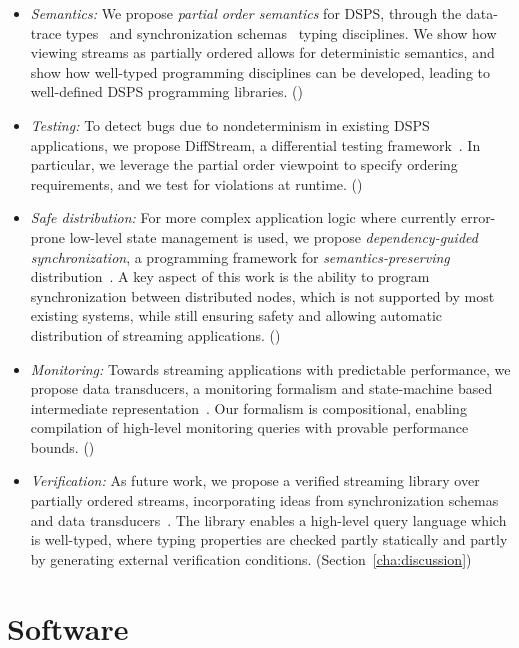 \begin{itemize}
\item
\emph{Semantics:}
We propose \emph{partial order semantics} for DSPS,
through the data-trace types~ and synchronization schemas~ typing disciplines.
We show how viewing streams as partially ordered allows for deterministic semantics,
and show how well-typed programming disciplines can be developed,
leading to well-defined DSPS programming libraries.
()

\item
\emph{Testing:}
To detect bugs due to nondeterminism in existing DSPS applications,
we propose DiffStream, a differential testing framework~.
In particular, we leverage the partial order viewpoint to specify
ordering requirements, and we test for violations at runtime.
()

\item
\emph{Safe distribution:}
For more complex application logic where currently error-prone
low-level state management is used,
we propose \emph{dependency-guided synchronization},
a programming framework for \emph{semantics-preserving} distribution~.
A key aspect of this work is the ability to program
synchronization between distributed nodes, which is not supported
by most existing systems,
while still ensuring safety and allowing automatic distribution
of streaming applications.
()

\item
\emph{Monitoring:}
Towards streaming applications with predictable performance,
we propose data transducers, a monitoring formalism and state-machine based intermediate representation~.
Our formalism is compositional, enabling compilation of high-level
monitoring queries with provable performance bounds.
()

\item
\emph{Verification:}
As future work, we propose a verified streaming library
over partially ordered streams, incorporating ideas from synchronization schemas~ and data transducers~.
The library enables a high-level query language which is well-typed,
where typing properties are checked partly statically and partly by
generating external verification conditions.
(Section~\ref{cha:discussion})
\end{itemize}

\section{Software}
